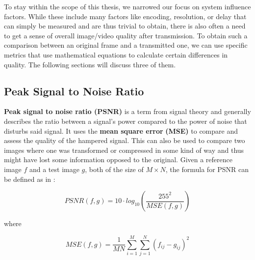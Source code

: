 To stay within the scope of this thesis, we narrowed our focus on system influence factors. While these include many factors like encoding, resolution, or delay that can simply be measured and are thus trivial to obtain, there is also often a need to get a sense of overall image/video quality after transmission. To obtain such a comparison between an original frame and a transmitted one, we can use specific metrics that use mathematical equations to calculate certain differences in quality. The following sections will discuss three of them. 


%



\subsection{Peak Signal to Noise Ratio}
\textbf{Peak signal to noise ratio (PSNR)} is a term from signal theory and generally describes the ratio between a signal's power compared to the power of noise that disturbs said signal. It uses the \textbf{mean square error} \textbf{(MSE)} to compare and assess the quality of the hampered signal. This can also be used to compare two images where one was transformed or compressed in some kind of way and thus might have lost some information opposed to the original. Given a reference image $ f $ and a test image $ g $, both of the size of $ M \times N $,  the formula for PSNR can be defined as in \cite{HoZi10}:

\begin{equation}
PSNR (f,g) = 10 \cdot log_{10}\left(\dfrac{255^{2}}{MSE(f,g)}\right)
\label{equation:quality_of_experience:PSNR_1}
\end{equation}

where

\begin{equation}
MSE(f,g) = \dfrac{1}{MN}\sum_{i=1}^{M}\sum_{j=1}^{N}(f_{ij}-g_{ij})^{2}
\label{equation:quality_of_experience:PSNR_2}
\end{equation}

